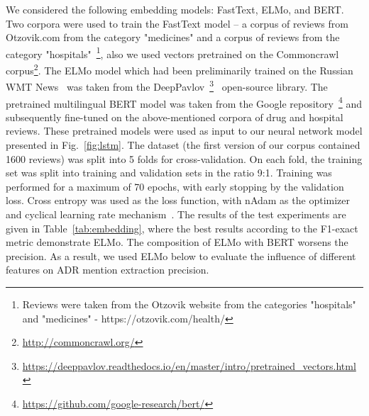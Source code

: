 \documentclass[a4paper,fleqn,longmktitle]{cas-dc}
\begin{document}
    We considered the following embedding models: FastText, ELMo, and BERT. Two corpora were used to train the FastText model -- a corpus of reviews from Otzovik.com from the category "medicines" and a corpus of reviews from the category "hospitals"~\footnote{Reviews were taken from the Otzovik website from the categories "hospitals" and "medicines" - https://otzovik.com/health/},
    also we used vectors pretrained on the Commoncrawl corpus\footnote{\url{http://commoncrawl.org/}}.
    The ELMo model which had been preliminarily trained on the Russian WMT News~\cite{statmt} was taken from the DeepPavlov~\footnote{\url{https://deeppavlov.readthedocs.io/en/master/intro/pretrained_vectors.html}}~\cite{burtsev2018deeppavlov} open-source library. The pretrained multilingual BERT model was taken from the Google repository~\footnote{\url{https://github.com/google-research/bert/}} and subsequently fine-tuned on the above-mentioned corpora of drug and hospital reviews. These pretrained models were used as input to our neural network model presented in Fig.~\ref{fig:lstm}. The dataset (the first version of our corpus contained 1600 reviews) was split into 5 folds for cross-validation. On each fold, the training set was split into training and validation sets in the ratio 9:1. Training was performed for a maximum of 70 epochs, with early stopping by the validation loss. Cross entropy was used as the loss function, with nAdam as the optimizer and cyclical learning rate mechanism~\cite{smith2017cyclical}. The results of the test experiments are given in Table~\ref{tab:embedding}, where the best results according to the F1-exact metric demonstrate ELMo. The composition of ELMo with BERT    worsens the precision. As a result, we used ELMo below to evaluate the influence of different features on ADR mention extraction precision.
    
    
\end{document}

